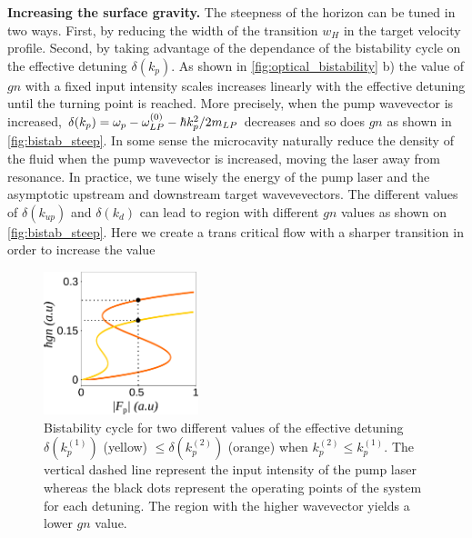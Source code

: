 \textbf{Increasing the surface gravity.}
The steepness of the horizon can be tuned in two ways. First, by reducing the width of the transition $w_H$ in the target velocity profile.
Second, by taking advantage of the dependance of the bistability cycle on the effective detuning $\delta(k_p)$.
As shown in \autoref{fig:optical_bistability} b) the value of $gn$ with a fixed input intensity scales increases linearly with the effective detuning until the turning point is reached. More precisely,
when the pump wavevector is increased,  $\delta(k_p) = \omega_p-\omega_{LP}^{(0)}- \hbar k_p^2/2m_{LP}$ decreases and so does $gn$ as shown in \autoref{fig:bistab_steep}. In some
sense the microcavity naturally reduce the density of the fluid when the pump wavevector is increased, moving the laser away from resonance.
In practice, we tune wisely the energy of the pump laser and the asymptotic upstream and downstream target wavevevectors. The different values of $\delta(k_{up})$ and $\delta(k_{d})$ can
lead to region with different $gn$ values as shown on \autoref{fig:bistab_steep}.
Here we create a trans critical flow with a sharper transition in order to increase the value 

\begin{figure}
    \centering
    \includegraphics[width=0.4\textwidth]{chap3_custom_st/fig/bistab_to_gn.pdf}
    \caption{Bistability cycle for two different values of the effective detuning $\delta(k^{(1)}_p)$ (yellow) $\leq \delta(k^{(2)}_p) $ (orange) when $k^{(2)}_p \leq k^{(1)}_p $. The vertical dashed line
    represent the input intensity of the pump laser whereas the black dots represent the operating points of the system for each detuning. The region with the higher wavevector
    yields a lower $gn$ value.}
    \label{fig:bistab_steep}
\end{figure}

